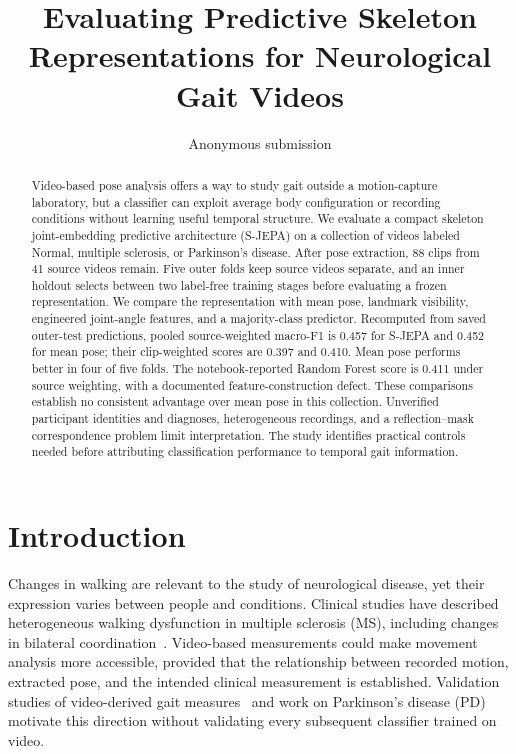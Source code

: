 \documentclass[10pt,twocolumn,letterpaper]{article}
\title{Evaluating Predictive Skeleton Representations for Neurological Gait Videos}
\author{Anonymous submission}
\begin{document}
\maketitle
\begin{abstract}
Video-based pose analysis offers a way to study gait outside a motion-capture laboratory, but a classifier can exploit average body configuration or recording conditions without learning useful temporal structure. We evaluate a compact skeleton joint-embedding predictive architecture (S-JEPA) on a collection of videos labeled Normal, multiple sclerosis, or Parkinson's disease. After pose extraction, 88 clips from 41 source videos remain. Five outer folds keep source videos separate, and an inner holdout selects between two label-free training stages before evaluating a frozen representation. We compare the representation with mean pose, landmark visibility, engineered joint-angle features, and a majority-class predictor. Recomputed from saved outer-test predictions, pooled source-weighted macro-F1 is 0.457 for S-JEPA and 0.452 for mean pose; their clip-weighted scores are 0.397 and 0.410. Mean pose performs better in four of five folds. The notebook-reported Random Forest score is 0.411 under source weighting, with a documented feature-construction defect. These comparisons establish no consistent advantage over mean pose in this collection. Unverified participant identities and diagnoses, heterogeneous recordings, and a reflection--mask correspondence problem limit interpretation. The study identifies practical controls needed before attributing classification performance to temporal gait information.
\end{abstract}

\section{Introduction}
Changes in walking are relevant to the study of neurological disease, yet their expression varies between people and conditions. Clinical studies have described heterogeneous walking dysfunction in multiple sclerosis (MS), including changes in bilateral coordination~\cite{filli2018,plotnik2020}. Video-based measurements could make movement analysis more accessible, provided that the relationship between recorded motion, extracted pose, and the intended clinical measurement is established. Validation studies of video-derived gait measures~\cite{stenum2021,stenum2024} and work on Parkinson's disease (PD)~\cite{shin2021} motivate this direction without validating every subsequent classifier trained on video.
\end{document}
